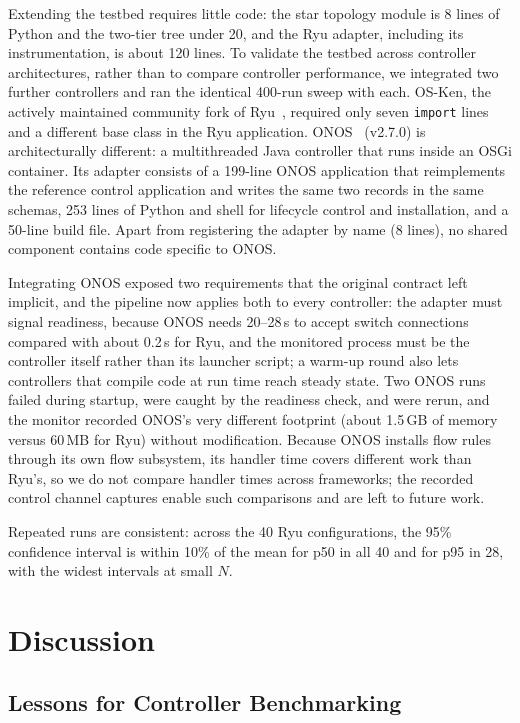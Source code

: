 \documentclass[conference]{IEEEtran}
\begin{document}
Extending the testbed requires little code: the star topology
module is 8 lines of Python and the two-tier tree under 20, and
the Ryu adapter, including its instrumentation, is about 120
lines. To validate the testbed across controller architectures,
rather than to compare controller performance, we integrated two
further controllers and ran the identical 400-run sweep with each. OS-Ken, the
actively maintained community fork of Ryu~\cite{RyuFramework},
required only seven \texttt{import} lines and a different base
class in the Ryu application. ONOS~\cite{Berde2014ONOS} (v2.7.0)
is architecturally different: a multithreaded Java controller that
runs inside an OSGi container. Its adapter consists of a 199-line
ONOS application that reimplements the reference control
application and writes the same two records in the same schemas,
253 lines of Python and shell for lifecycle control and
installation, and a 50-line build file. Apart from registering the
adapter by name (8 lines), no shared component contains code
specific to ONOS.

Integrating ONOS exposed two requirements that the original
contract left implicit, and the pipeline now applies both to every
controller: the adapter must signal readiness, because ONOS needs
20--28\,s to accept switch connections compared with about 0.2\,s
for Ryu, and the monitored process must be the controller itself
rather than its launcher script; a warm-up round also lets
controllers that compile code at run time reach steady state. Two
ONOS runs failed during startup, were caught by the readiness
check, and were rerun, and the monitor recorded ONOS's very
different footprint (about 1.5\,GB of memory versus 60\,MB for
Ryu) without modification. Because ONOS installs flow
rules through its own flow subsystem, its handler time covers
different work than Ryu's, so we do not compare handler times
across frameworks; the recorded control channel captures enable
such comparisons and are left to future work.

Repeated runs are consistent: across the 40 Ryu configurations,
the 95\% confidence interval is within 10\% of the mean for p50 in
all 40 and for p95 in 28, with the widest intervals at small $N$.

\section{Discussion}
\label{sec:discussion}

\subsection{Lessons for Controller Benchmarking}
\end{document}
